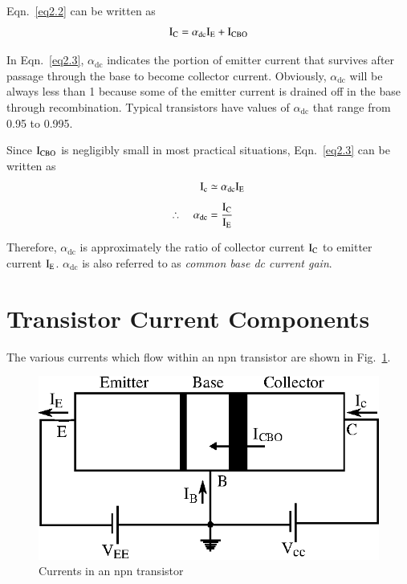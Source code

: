 Eqn.~\eqref{eq2.2} can be written as
\begin{equation}
\textrm{I}_{\textrm{C}}=\alpha_{\text{dc}}\textrm{I}_{\textrm{E}}+\textrm{I}_{\text{CBO}}\label{eq2.3}
\end{equation}

In Eqn.~\eqref{eq2.3}, $\alpha_{\text{dc}}$ indicates the portion of emitter current that survives after passage through the base to become collector current. Obviously, $\alpha_{\text{dc}}$ will be always less than 1 because some of the emitter current is drained off in the base through recombination. Typical transistors have values of $\alpha_{\text{dc}}$ that range from 0.95 to 0.995.

Since $\textrm{I}_{\text{CBO}}$ is negligibly small in most practical situations, Eqn.~\eqref{eq2.3} can be written as
\begin{align}
\textrm{I}_{\textrm{c}} &\simeq \alpha_{\text{dc}}\textrm{I}_{\textrm{E}}\label{eq2.4}\\[4pt]
\therefore\quad \alpha_{\text{dc}} &= \frac{\textrm{I}_{\textrm{C}}}{\textrm{I}_{\textrm{E}}}\label{eq2.5}
\end{align}

Therefore, $\alpha_{\text{dc}}$ is approximately the ratio of collector current $\textrm{I}_{\textrm{C}}$ to emitter current $\textrm{I}_{\textrm{E}}$. $\alpha_{\text{dc}}$ is also referred to as {\em common base dc current gain}.

\section{Transistor Current Components}\label{sec2.2}

The various currents which flow within an npn transistor are shown in Fig.~\ref{fig2.6}.
\begin{figure}[H]
\centering
\includegraphics{chap2/fig6.eps}
\caption{Currents in an npn transistor}\label{fig2.6}
\end{figure}

